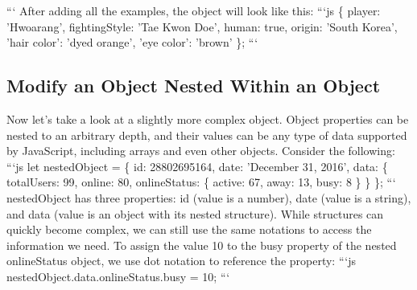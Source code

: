 \documentclass{article}%
\begin{document}
```\newline%
After adding all the examples, the object will look like this:\newline%
```js\newline%
\{\newline%
  player: 'Hwoarang',\newline%
  fightingStyle: 'Tae Kwon Doe',\newline%
  human: true,\newline%
  origin: 'South Korea',\newline%
  'hair color': 'dyed orange',\newline%
  'eye color': 'brown'\newline%
\};\newline%
```\newline%

%
\subsection{Modify an Object Nested Within an Object}%
\label{subsec:ModifyanObjectNestedWithinanObject}%
Now let's take a look at a slightly more complex object. Object properties can be nested to an arbitrary depth, and their values can be any type of data supported by JavaScript, including arrays and even other objects. Consider the following:\newline%
```js\newline%
let nestedObject = \{\newline%
  id: 28802695164,\newline%
  date: 'December 31, 2016',\newline%
  data: \{\newline%
    totalUsers: 99,\newline%
    online: 80,\newline%
    onlineStatus: \{\newline%
      active: 67,\newline%
      away: 13,\newline%
      busy: 8\newline%
    \}\newline%
  \}\newline%
\};\newline%
```\newline%
nestedObject has three properties: id (value is a number), date (value is a string), and data (value is an object with its nested structure). While structures can quickly become complex, we can still use the same notations to access the information we need. To assign the value 10 to the busy property of the nested onlineStatus object, we use dot notation to reference the property:\newline%
```js\newline%
nestedObject.data.onlineStatus.busy = 10;\newline%
```\newline%
\end{document}
